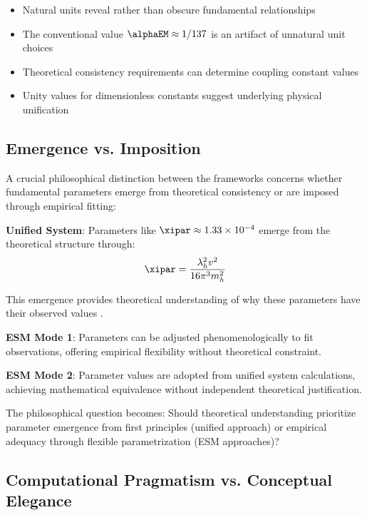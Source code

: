 	\begin{itemize}
		\item Natural units reveal rather than obscure fundamental relationships
		\item The conventional value $\alphaEM \approx 1/137$ is an artifact of unnatural unit choices
		\item Theoretical consistency requirements can determine coupling constant values
		\item Unity values for dimensionless constants suggest underlying physical unification
	\end{itemize}
	
	\subsection{Emergence vs. Imposition}
	\label{subsec:emergence_imposition}
	
	A crucial philosophical distinction between the frameworks concerns whether fundamental parameters emerge from theoretical consistency or are imposed through empirical fitting:
	
	\textbf{Unified System}: Parameters like $\xipar \approx 1.33 \times 10^{-4}$ emerge from the theoretical structure through:
	\begin{equation}
		\xipar = \frac{\lambda_h^2 v^2}{16\pi^3 m_h^2}
	\end{equation}
	
	This emergence provides theoretical understanding of why these parameters have their observed values \cite{pascher_beta_derivation_2025}.
	
	\textbf{ESM Mode 1}: Parameters can be adjusted phenomenologically to fit observations, offering empirical flexibility without theoretical constraint.
	
	\textbf{ESM Mode 2}: Parameter values are adopted from unified system calculations, achieving mathematical equivalence without independent theoretical justification.
	
	The philosophical question becomes: Should theoretical understanding prioritize parameter emergence from first principles (unified approach) or empirical adequacy through flexible parametrization (ESM approaches)? \cite{vanFraassen1980}
	
	\subsection{Computational Pragmatism vs. Conceptual Elegance}
	\label{subsec:pragmatism_vs_elegance}
	
